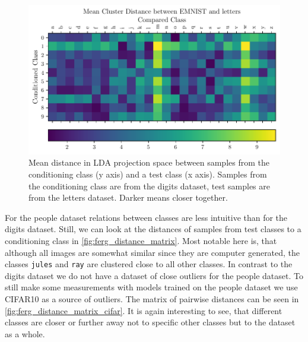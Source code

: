 \begin{figure}[htpb]
	\centering
	\includegraphics{figures/samples/emnist_distance_matrix_letters_lda.pdf}
	\caption{Mean distance in LDA projection space between samples from the
		conditioning class (y axis) and a test class (x axis). Samples
		from the conditioning class are from the digits dataset, test
		samples are from the letters dataset. Darker means closer
		together.}%
	\label{fig:emnist_distance_matrix_letters}
\end{figure}

For the people dataset relations between classes are less intuitive than for the
digits dataset. Still, we can look at the distances of samples from test
classes to a conditioning class in \autoref{fig:ferg_distance_matrix}. Most
notable here is, that although all images are somewhat similar since they are
computer generated, the classes \texttt{jules} and \texttt{ray} are clustered
close to all other classes.
In contrast to the digits dataset we do not have a dataset of close outliers
for the people
dataset. To still make some measurements with models trained on the people
dataset we use CIFAR10 as a source of outliers. The matrix of pairwise
distances can be seen in \autoref{fig:ferg_distance_matrix_cifar}. It is again
interesting to see, that different classes are closer or further away not to
specific other classes but to the dataset as a whole.

